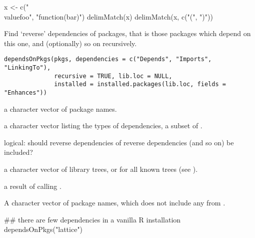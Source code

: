 %
\begin{Examples}
\begin{ExampleCode}
x <- c("\\value{foo}", "function(bar)")
delimMatch(x)
delimMatch(x, c("(", ")"))
\end{ExampleCode}
\end{Examples}
%
\begin{Description}\relax
Find `reverse' dependencies of packages, that is those packages
which depend on this one, and (optionally) so on recursively.
\end{Description}
%
\begin{Usage}
\begin{verbatim}
dependsOnPkgs(pkgs, dependencies = c("Depends", "Imports", "LinkingTo"),
              recursive = TRUE, lib.loc = NULL,
              installed = installed.packages(lib.loc, fields = "Enhances"))
\end{verbatim}
\end{Usage}
%
\begin{Arguments}
\begin{ldescription}
\item[\code{pkgs}] a character vector of package names.
\item[\code{dependencies}] a character vector listing the types of
dependencies, a subset of .
\item[\code{recursive}] logical: should reverse dependencies of reverse
dependencies (and so on) be included?
\item[\code{lib.loc}] a character vector of \R{} library trees, or 
for all known trees (see ).
\item[\code{installed}] a result of calling .
\end{ldescription}
\end{Arguments}
%
\begin{Value}
A character vector of package names, which does not include any from
.
\end{Value}
%
\begin{Examples}
\begin{ExampleCode}
## there are few dependencies in a vanilla R installation
dependsOnPkgs("lattice")
\end{ExampleCode}
\end{Examples}
